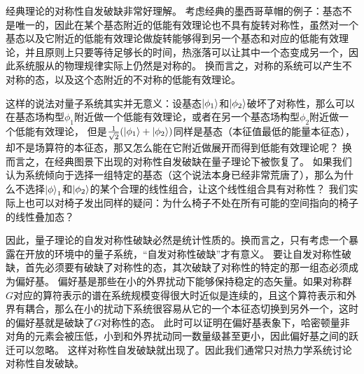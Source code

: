 \documentclass[hyperref, UTF8, a4paper]{ctexart}
\begin{document}
经典理论的对称性自发破缺非常好理解。
考虑经典的墨西哥草帽的例子：基态不是唯一的，因此在某个基态附近的低能有效理论也不具有旋转对称性，虽然对一个基态以及它附近的低能有效理论做旋转能够得到另一个基态和对应的低能有效理论，并且原则上只要等待足够长的时间，热涨落可以让其中一个态变成另一个，因此系统服从的物理规律实际上仍然是对称的。
换而言之，对称的系统可以产生不对称的态，以及这个态附近的不对称的低能有效理论。

这样的说法对量子系统其实并无意义：设基态$\ket{\phi_1}$和$\ket{\phi_2}$破坏了对称性，那么可以在基态场构型$\phi_1$附近做一个低能有效理论，或者在另一个基态场构型$\phi_2$附近做一个低能有效理论，
但是$\frac{1}{\sqrt{2}} (\ket{\phi_1} + \ket{\phi_2})$同样是基态（本征值最低的能量本征态），却不是场算符的本征态，那又怎么能在它附近做展开而得到低能有效理论呢？
换而言之，在经典图景下出现的对称性自发破缺在量子理论下被恢复了。
如果我们认为系统倾向于选择一组特定的基态（这个说法本身已经非常荒唐了），那么为什么不选择$\ket{\phi}_1$和$\ket{\phi_2}$的某个合理的线性组合，让这个线性组合具有对称性？
我们实际上也可以对椅子发出同样的疑问：为什么椅子不处在所有可能的空间指向的椅子的线性叠加态？

因此，量子理论的自发对称性破缺必然是统计性质的。换而言之，只有考虑一个暴露在开放的环境中的量子系统，“自发对称性破缺”才有意义。
要让自发对称性破缺，首先必须要有破缺了对称性的态，其次破缺了对称性的特定的那一组态必须成为偏好基。
偏好基是那些在小的外界扰动下能够保持稳定的态矢量。如果对称群$G$对应的算符表示的谱在系统规模变得很大时近似是连续的，且这个算符表示和外界有耦合，那么在小的扰动下系统很容易从它的一个本征态切换到另外一个，这时的偏好基就是破缺了$G$对称性的态。
此时可以证明在偏好基表象下，哈密顿量非对角的元素会被压低，小到和外界扰动同一数量级甚至更小，因此偏好基之间的跃迁可以忽略。
这样对称性自发破缺就出现了。因此我们通常只对热力学系统讨论对称性自发破缺。
\end{document}
